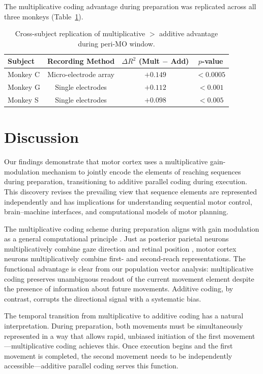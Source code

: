 \documentclass[11pt]{article}
\begin{document}
The multiplicative coding advantage during preparation was replicated across all three monkeys (Table~\ref{tab:replication}).

\begin{table}[H]
\centering
\caption{Cross-subject replication of multiplicative $>$ additive advantage during peri-MO window.}
\label{tab:replication}
\begin{tabular}{@{}lccc@{}}
\toprule
Subject & Recording Method & $\Delta R^2$ (Mult $-$ Add) & $p$-value \\
\midrule
Monkey C & Micro-electrode array & $+0.149$ & $< 0.0005$ \\
Monkey G & Single electrodes & $+0.112$ & $< 0.001$ \\
Monkey S & Single electrodes & $+0.098$ & $< 0.005$ \\
\bottomrule
\end{tabular}
\end{table}

\section{Discussion}

Our findings demonstrate that motor cortex uses a multiplicative gain-modulation mechanism to jointly encode the elements of reaching sequences during preparation, transitioning to additive parallel coding during execution. This discovery revises the prevailing view that sequence elements are represented independently and has implications for understanding sequential motor control, brain--machine interfaces, and computational models of motor planning.

The multiplicative coding scheme during preparation aligns with gain modulation as a general computational principle \citep{salinas2001gain, andersen1985encoding}. Just as posterior parietal neurons multiplicatively combine gaze direction and retinal position \citep{zipser1988back}, motor cortex neurons multiplicatively combine first- and second-reach representations. The functional advantage is clear from our population vector analysis: multiplicative coding preserves unambiguous readout of the current movement element despite the presence of information about future movements. Additive coding, by contrast, corrupts the directional signal with a systematic bias.

The temporal transition from multiplicative to additive coding has a natural interpretation. During preparation, both movements must be simultaneously represented in a way that allows rapid, unbiased initiation of the first movement---multiplicative coding achieves this. Once execution begins and the first movement is completed, the second movement needs to be independently accessible---additive parallel coding serves this function.
\end{document}
